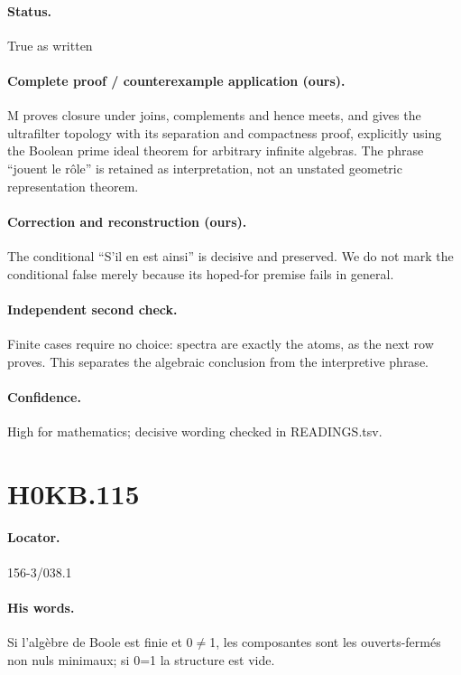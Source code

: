 \paragraph{Status.} True as written

\paragraph{Complete proof / counterexample application (ours).} M proves closure under joins, complements and hence meets, and gives the ultrafilter topology with its separation and compactness proof, explicitly using the Boolean prime ideal theorem for arbitrary infinite algebras. The phrase “jouent le rôle” is retained as interpretation, not an unstated geometric representation theorem.

\paragraph{Correction and reconstruction (ours).} The conditional “S’il en est ainsi” is decisive and preserved. We do not mark the conditional false merely because its hoped-for premise fails in general.

\paragraph{Independent second check.} Finite cases require no choice: spectra are exactly the atoms, as the next row proves. This separates the algebraic conclusion from the interpretive phrase.

\paragraph{Confidence.} High for mathematics; decisive wording checked in READINGS.tsv.

\section*{H0KB.115}\label{statement:H0KB.115}
\paragraph{Locator.} 156-3/038.1

\paragraph{His words.} Si l’algèbre de Boole est finie et 0\ensuremath{\ne}1, les composantes sont les ouverts-fermés non nuls minimaux; si 0=1 la structure est vide.

